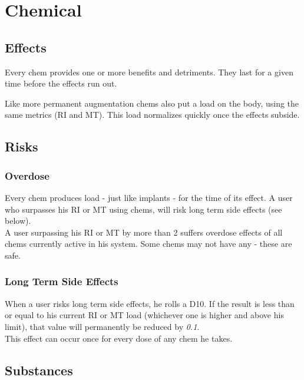 \section{Chemical}
\label{sec:chems}

\subsection{Effects}
Every chem provides one or more benefits and detriments.
They last for a given time before the effects run out.
\par%
Like more permanent augmentation chems also put a load on the body, using the same metrics (RI and MT).
This load normalizes quickly once the effects subside.

\subsection{Risks}
\subsubsection*{Overdose}
Every chem produces load - just like implants
	- for the time of its effect.
A user who surpasses his RI or MT using chems,
	will risk long term side effects (see below).
\\%
A user surpassing his RI or MT by more than 2 suffers overdose effects
	of all chems currently active in his system.
Some chems may not have any - these are safe.
\subsubsection*{Long Term Side Effects}
When a user risks long term side effects,
	he rolls a D10.
If the result is
	less than or equal to
	his current RI or MT load
		(whichever one is higher and above his limit),
	that value will permanently be reduced by \emph{0.1}.
\\%
This effect can occur once for every dose of any chem he takes.

\subsection{Substances}
